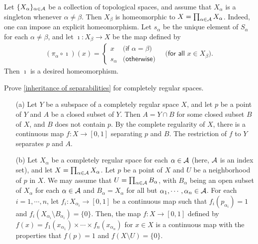 \begin{rmk}
    Let $\{X_\alpha\}_{\alpha\in{\mathcal{A}}}$ be a collection of topological spaces, and assume that $X_\alpha$ is a singleton whenever $\alpha\neq\beta$.
    Then $X_\beta$ is homeomorphic to $X=\prod_{\alpha\in{\mathcal{A}}} X_\alpha$.
    Indeed, one can impose an explicit homeomorphism.
    Let $s_\alpha$ be the unique element of $S_\alpha$ for each $\alpha\neq\beta$, and let $\imath: X_\beta\rightarrow X$ be the map defined by
    \begin{align*}
        (\pi_\alpha\circ\imath)(x)=\left\{\begin{array}{cc}
            x   &   \textsf{(if $\alpha=\beta$)}\\
            s_\alpha    &   \textsf{(otherwise)}
        \end{array}\right.
        \quad
        \textsf{(for all $x\in X_\beta$)}.
    \end{align*}
    Then $\imath$ is a desired homeomorphism.
\end{rmk}

\begin{prob}\label{inheritance: completely regular}
    Prove \cref{inheritance of separabilities} for completely regular spaces.
\end{prob}
\begin{sol}
    \begin{enumerate}
        \item[(a)]
        {
            Let $Y$ be a subspace of a completely regular space $X$, and let $p$ be a point of $Y$ and $A$ be a closed subset of $Y$.
            Then $A=Y\cap B$ for some closed subset $B$ of $X$, and $B$ does not contain $p$.
            By the complete regularity of $X$, there is a continuous map $f: X\rightarrow [0, 1]$ separating $p$ and $B$.
            The restriction of $f$ to $Y$ separates $p$ and $A$.
        }
        \item[(b)]
        {
            Let $X_\alpha$ be a completely regular space for each $\alpha\in{\mathcal{A}}$ (here, ${\mathcal{A}}$ is an index set), and let $X=\prod_{\alpha\in{\mathcal{A}}} X_\alpha$.
            Let $p$ be a point of $X$ and $U$ be a neighborhood of $p$ in $X$.
            We may assume that $U=\prod_{\alpha\in{\mathcal{A}}} B_\alpha$, with $B_\alpha$ being an open subset of $X_\alpha$ for each $\alpha\in{\mathcal{A}}$ and $B_\alpha=X_\alpha$ for all but $\alpha_1, \cdots, \alpha_n\in{\mathcal{A}}$.
            For each $i=1, \cdots, n$, let $f_i: X_{\alpha_i}\rightarrow [0, 1]$ be a continuous map such that $f_i(p_{\alpha_i})=1$ and $f_i(X_{\alpha_i}\setminus B_{\alpha_i})=\{0\}$.
            Then, the map $f: X\rightarrow [0, 1]$ defined by $f(x)=f_1(x_{\alpha_1})\times\cdots\times f_n(x_{\alpha_n})$ for $x\in X$ is a continuous map with the properties that $f(p)=1$ and $f(X\setminus U)=\{0\}$.
        }
    \end{enumerate}
\end{sol}

